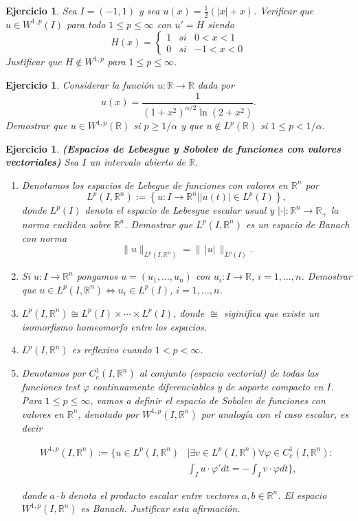 \documentclass{article}
\newcounter{ejer}
\newtheorem{ejercicio}[ejer]{Ejercicio}}
\newcommand{\rr}{\mathbb{R}}
\begin{document}
\begin{ejercicio}
Sea $I=(-1,1)$ y sea $u(x)=\frac{1}{2}(|x|+x)$.
Verificar que $u\in  W^{1,p}(I)$ para todo $1\leq p\leq \infty$ con $u'=H$ siendo \[H(x)=\left\{\begin{array}{ccc}
1&si&0<x<1
\\
0&si&-1<x<0
\end{array}
\right.\]
Justificar que  $H\notin W^{1,p} $ para $1\leq p \leq \infty$.
\end{ejercicio}





\begin{ejercicio} Considerar la función $u:\mathbb{R}\to\mathbb{R}$ dada por
\[u(x)=\frac{1}{(1+x^2)^{\alpha/2} \ln(2+x^2) }.\]
Demostrar que $u\in W^{1,p}(\rr)$ si $p\geq 1/\alpha$ y que $u\notin  L^{p}(\rr)$ si $1\leq p <1/\alpha$.

\end{ejercicio}

\begin{ejercicio} \textbf{(Espacios de Lebesgue y Sobolev de funciones con valores vectoriales)} Sea $I$ un intervalo abierto de $\rr$.
\begin{enumerate}
 \item Denotamos los espacios de Lebegue de funciones con valores en $\rr^n$ por
 \[ L^p(I,\rr^n):=\left\{u:I\to\rr^n\big| |u(t)|\in L^p(I)\right\},\]
 donde $ L^p(I)$ denota el espacio de Lebesgue escalar usual y $|\cdot|:\rr^n\to\rr_+$ la norma euclidea sobre $\rr^n$. Demostrar que $L^p(I,\rr^n)$ es un espacio de Banach con norma
 \[\|u\|_{L^p(I,\rr^n)}=\|\, |u| \,\|_{L^p(I)}.\]
 \item Si $u:I\to \rr^n$ pongamos $u=(u_1,\ldots,u_n)$ con $u_i:I\to\rr$, $i=1,\ldots,n$. Demostrar que $u\in L^p(I,\rr^n)\Leftrightarrow u_i\in L^p(I)$, $i=1,\ldots,n$.
 \item $L^p(I,\rr^n)\cong L^p(I)\times\cdots\times L^p(I)$, donde $\cong $ siginifica que existe un isomorfismo homeomorfo entre los espacios.
 \item  $L^p(I,\rr^n)$ es reflexivo cuando $1<p<\infty$.

\item Denotamos por $C_c^1(I,\rr^n)$ al conjunto (espacio vectorial) de todas las funciones test $\varphi$  continuamente diferenciables y de soporte compacto en $I$.  Para $1\leq p\leq \infty$, vamos a definir el espacio de Sobolev de funciones con valores en $\rr^n$, denotado por $W^{1,p}(I,\rr^n)$ por analogía con el caso escalar, es decir

\[
\begin{split}
W^{1,p}(I,\rr^n):=\bigg\{ u\in L^p(I,\rr^n) &\bigg| \exists v\in  L^p(I,\rr^n) \forall\varphi \in C_c^1(I,\rr^n)  : \\
&\int_I u\cdot \varphi' dt=-  \int_I v\cdot \varphi dt \bigg\},
\end{split}
\]

donde $a\cdot b$ denota el producto escalar entre vectores $a,b\in\rr^n$. El espacio $W^{1,p}(I,\rr^n)$ es Banach. Justificar esta afirmación.
\end{enumerate}
\end{ejercicio}
\end{document}
